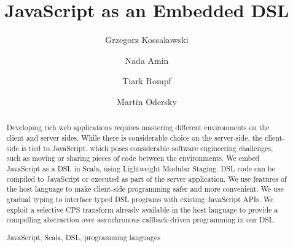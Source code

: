 \documentclass[runningheads,a4paper]{llncs}
\newcommand{\keywords}[1]{\par\addvspace\baselineskip
\noindent\keywordname\enspace\ignorespaces#1}
\begin{document}
\mainmatter  %

\title{JavaScript as an Embedded DSL}

%
%
\author{Grzegorz Kossakowski \and Nada Amin \and Tiark Rompf \and Martin Odersky}
%


%
%

\maketitle


\begin{abstract}

Developing rich web applications requires mastering different
environments on the client and server sides. While there is
considerable choice on the server-side, the client-side is tied to
JavaScript, which poses considerable software engineering challenges,
such as moving or sharing pieces of code between the environments. We
embed JavaScript as a DSL in Scala, using Lightweight Modular Staging.
DSL code can be compiled to JavaScript or executed as part of the
server application. We use features of the host language to make
client-side programming safer and more convenient. We use gradual
typing to interface typed DSL programs with existing JavaScript APIs.
We exploit a selective CPS transform already available in the host
language to provide a compelling abstraction over asynchronous
callback-driven programming in our DSL.

\keywords{JavaScript, Scala, DSL, programming languages}
\end{abstract}
\end{document}

